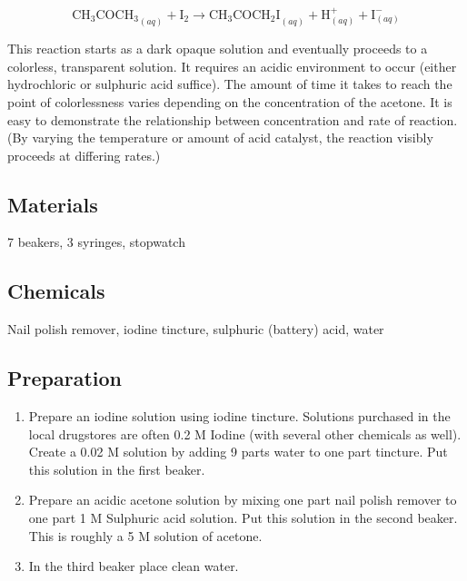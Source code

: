 \[ \mathrm{CH_3COCH_3}_{(aq)} + \mathrm{I_2} \longrightarrow \mathrm{CH_3COCH_2I}_{(aq)} + \mathrm{H}^{+}_{(aq)} + \mathrm{I}^{-}_{(aq)} \]

This reaction starts as a dark opaque solution and eventually proceeds to a colorless, transparent solution. It requires an acidic environment to occur (either hydrochloric or sulphuric acid suffice). The amount of time it takes to reach the point of colorlessness varies depending on the concentration of the acetone. It is easy to demonstrate the relationship between concentration and rate of reaction. (By varying the temperature or amount of acid catalyst, the reaction visibly proceeds at differing rates.)

\subsection{Materials}
7 beakers, 3 syringes, stopwatch

\subsection{Chemicals}
Nail polish remover, iodine tincture, sulphuric (battery) acid, water

\subsection{Preparation}
\begin{enumerate}
\item Prepare an iodine solution using iodine tincture. Solutions purchased in the local drugstores are often 0.2 M Iodine (with several other chemicals as well). Create a 0.02 M solution by adding 9 parts water to one part tincture. Put this solution in the first beaker.
\item Prepare an acidic acetone solution by mixing one part nail polish remover to one part 1 M Sulphuric acid solution. Put this solution in the second beaker. This is roughly a 5 M solution of acetone.
\item In the third beaker place clean water.
\end{enumerate}


